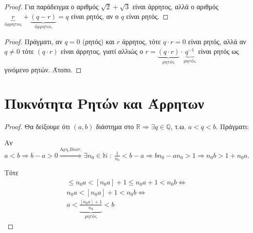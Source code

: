 \documentclass[main.tex]{subfiles}
\begin{document}
\begin{proof}
    Για παράδειγμα ο αριθμός $ \sqrt{2} + \sqrt{3} $ είναι άρρητος, αλλά ο αριθμός
    $ \underbrace{r}_{\text{άρρητος}}+ \underbrace{(q-r)}_{\text{άρρητος}} =q $ 
    είναι ρητός, αν ο $q$ είναι ρητός.
\end{proof}


\begin{proof}
    Πράγματι, αν $ q=0 $ (ρητός) και $ r $ άρρητος, τότε $ q \cdot r =0 $ είναι ρητός, 
    αλλά αν $ q \neq 0 $ τότε $ (q \cdot r) $ είναι άρρητος, γιατί αλλιώς ο 
    $ r = \underbrace{(q \cdot r)}_{\text{ρητός}} \cdot \underbrace{q^{-1}}_{\text{
    ρητός}} $ είναι ρητός ως γινόμενο ρητών. Άτοπο.
\end{proof}


\section{Πυκνότητα Ρητών και Άρρητων}


\begin{proof}
\item {}
    Θα δείξουμε ότι $ (a,b) $ διάστημα στο $ \mathbb{R} \Rightarrow \exists q 
    \in \mathbb{Q} $, τ.ω. $ a < q < b $. Πράγματι:

    Αν $ a<b \Rightarrow b-a >0 \overset{\text{Αρχ.Ιδιοτ.}}{\Rightarrow} \exists 
    n_{0} \in \mathbb{N} \; : \; \frac{1}{n_{0}} < b-a \Rightarrow b n_{0} - a n_{0} 
    >1 \Rightarrow n_{0}b > 1+ n_{0}a$.

    Τότε 
    \begin{gather*}
        [n_{0}a] \leq n_{0}a < [n_{0}a]+1 \leq n_{0}a +1 < n_{0}b \Leftrightarrow \\
        n_{0}a < [n_{0}a]+1 < n_{0}b \Leftrightarrow \\
        a < \underbrace{\frac{[n_{0}a]+1}{n_{0}}}_{\text{ρητός}}< b
    \end{gather*}
\end{proof}
\end{document}
